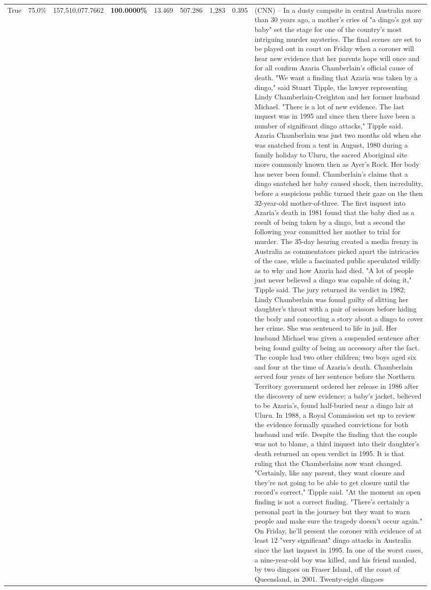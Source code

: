 \begin{table}[H]
\begin{tabular}{lllrlllll}
True & 75.0\% & 157,510,077.7662 & \bfseries \color{red} 100.0000\% & 13.469 & 507.286 & 1,283 & 0.395 & (CNN) -- In a dusty campsite in central Australia more than 30 years ago, a mother's cries of "a dingo's got my baby" set the stage for one of the country's most intriguing murder mysteries. The final scenes are set to be played out in court on Friday when a coroner will hear new evidence that her parents hope will once and for all confirm Azaria Chamberlain's official cause of death. "We want a finding that Azaria was taken by a dingo," said Stuart Tipple, the lawyer representing Lindy Chamberlain-Creighton and her former husband Michael. "There is a lot of new evidence. The last inquest was in 1995 and since then there have been a number of significant dingo attacks," Tipple said. Azaria Chamberlain was just two months old when she was snatched from a tent in August, 1980 during a family holiday to Uluru, the sacred Aboriginal site more commonly known then as Ayer's Rock. Her body has never been found. Chamberlain's claims that a dingo snatched her baby caused shock, then incredulity, before a suspicious public turned their gaze on the then 32-year-old mother-of-three. The first inquest into Azaria's death in 1981 found that the baby died as a result of being taken by a dingo, but a second the following year committed her mother to trial for murder. The 35-day hearing created a media frenzy in Australia as commentators picked apart the intricacies of the case, while a fascinated public speculated wildly as to why and how Azaria had died. "A lot of people just never believed a dingo was capable of doing it," Tipple said. The jury returned its verdict in 1982; Lindy Chamberlain was found guilty of slitting her daughter's throat with a pair of scissors before hiding the body and concocting a story about a dingo to cover her crime. She was sentenced to life in jail. Her husband Michael was given a suspended sentence after being found guilty of being an accessory after the fact. The couple had two other children; two boys aged six and four at the time of Azaria's death. Chamberlain served four years of her sentence before the Northern Territory government ordered her release in 1986 after the discovery of new evidence; a baby's jacket, believed to be Azaria's, found half-buried near a dingo lair at Uluru. In 1988, a Royal Commission set up to review the evidence formally quashed convictions for both husband and wife. Despite the finding that the couple was not to blame, a third inquest into their daughter's death returned an open verdict in 1995. It is that ruling that the Chamberlains now want changed. "Certainly, like any parent, they want closure and they're not going to be able to get closure until the record's correct," Tipple said. "At the moment an open finding is not a correct finding. "There's certainly a personal part in the journey but they want to warn people and make sure the tragedy doesn't occur again." On Friday, he'll present the coroner with evidence of at least 12 "very significant" dingo attacks in Australia since the last inquest in 1995. In one of the worst cases, a nine-year-old boy was killed, and his friend mauled, by two dingoes on Fraser Island, off the coast of Queensland, in 2001. Twenty-eight dingoes 
\end{tabular}
\end{table}
